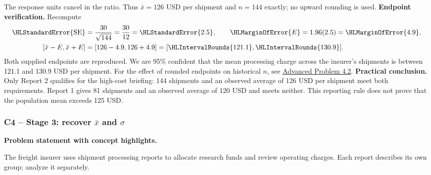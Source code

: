 The response units cancel in the ratio. Thus $\bar x=126$ USD per shipment and $n=144$ exactly; no upward rounding is used.
\textbf{Endpoint verification.} Recompute
\[\begin{aligned}
\HLStandardError{\mathrm{SE}}&=\frac{30}{\sqrt{144}}=\frac{30}{12}=\HLStandardError{2.5},\qquad \HLMarginOfError{E}=1.96(2.5)=\HLMarginOfError{4.9},\\
[\bar x-E,\bar x+E]&=[126-4.9,126+4.9]=[\HLIntervalBounds{121.1},\HLIntervalBounds{130.9}].
\end{aligned}\]
Both supplied endpoints are reproduced. We are 95\% confident that the mean processing charge across the insurer's shipments is between 121.1 and 130.9 USD per shipment.
For the effect of rounded endpoints on historical $n$, see \hyperref[prob:c4-advanced-2]{Advanced Problem 4.2}.
\textbf{Practical conclusion.} Only Report 2 qualifies for the high-cost briefing: 144 shipments and an observed average of 126 USD per shipment meet both requirements. Report 1 gives 81 shipments and an observed average of 120 USD and meets neither. This reporting rule does not prove that the population mean exceeds 125 USD.
\clearpage
\subsubsection*{C4 -- Stage 3: recover $\bar x$ and $\sigma$}\label{sol:c4-3-c}
\textbf{Problem statement with concept highlights.}
\begingroup\raggedright
The freight insurer uses shipment processing reports to allocate research funds and review operating charges. Each report describes its own group; analyze it separately.

